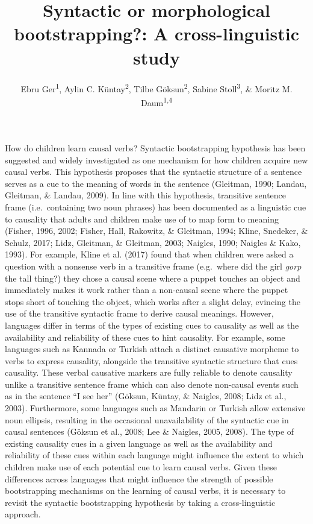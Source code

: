 \documentclass[man]{apa6}
\title{Syntactic or morphological bootstrapping?: A cross-linguistic study}
\author{Ebru Ger\textsuperscript{1}, Aylin C. Küntay\textsuperscript{2}, Tilbe
Göksun\textsuperscript{2}, Sabine Stoll\textsuperscript{3}, \& Moritz M.
Daum\textsuperscript{1,4}}
\date{}
\affiliation{
\vspace{0.5cm}
\textsuperscript{1} Department of Psychology, University of Zurich\\\textsuperscript{2} Department of Psychology, Koç University\\\textsuperscript{3} Institute of Comparative Linguistics, University of Zurich\\\textsuperscript{4} Neuroscience Center Zurich, University of Zurich and ETH Zurich}
\begin{document}
\maketitle

How do children learn causal verbs? Syntactic bootstrapping hypothesis
has been suggested and widely investigated as one mechanism for how
children acquire new causal verbs. This hypothesis proposes that the
syntactic structure of a sentence serves as a cue to the meaning of words in the
sentence \cite{gleitman1990structural} (Gleitman, 1990; Landau, Gleitman, \& Landau,
2009). In line with this hypothesis, transitive sentence frame (i.e.~containing two
noun phrases) has been documented as a linguistic cue to causality that
adults and children make use of to map form to meaning (Fisher, 1996,
2002; Fisher, Hall, Rakowitz, \& Gleitman, 1994; Kline, Snedeker, \&
Schulz, 2017; Lidz, Gleitman, \& Gleitman, 2003; Naigles, 1990; Naigles \& Kako,
1993). For example, Kline et al. (2017) found that when
children were asked a question with a nonsense verb in a transitive
frame (e.g.~where did the girl \emph{gorp} the tall thing?) they chose a
causal scene where a puppet touches an object and immediately makes it
work rather than a non-causal scene where the puppet stops short of
touching the object, which works after a slight delay, evincing the use
of the transitive syntactic frame to derive causal meanings. However,
languages differ in terms of the types of existing cues to causality as
well as the availability and reliability of these cues to hint
causality. For example, some languages such as Kannada or Turkish attach
a distinct causative morpheme to verbs to express causality, alongside
the transitive syntactic structure that cues causality. These verbal
causative markers are fully reliable to denote causality unlike a
transitive sentence frame which can also denote non-causal events such
as in the sentence \enquote{I see her} (Göksun, Küntay, \& Naigles,
2008; Lidz et al., 2003). Furthermore, some languages such as Mandarin
or Turkish allow extensive noun ellipsis, resulting in the occasional
unavailability of the syntactic cue in causal sentences (Göksun et al.,
2008; Lee \& Naigles, 2005, 2008). The type of existing causality cues
in a given language as well as the availability and reliability of these
cues within each language might influence the extent to which children
make use of each potential cue to learn causal verbs. Given these
differences across languages that might influence the strength of
possible bootstrapping mechanisms on the learning of causal verbs, it is
necessary to revisit the syntactic bootstrapping hypothesis by taking a
cross-linguistic approach.
\end{document}
